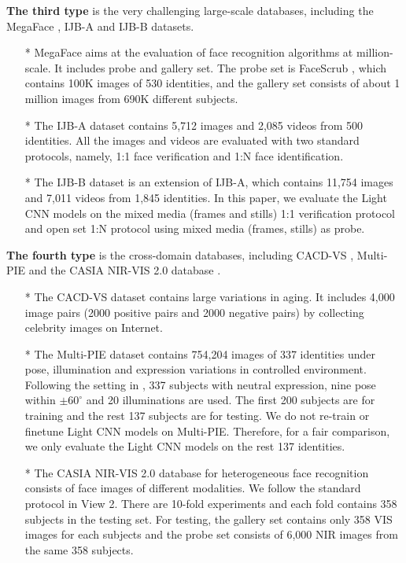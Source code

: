 \documentclass[journal,transmag]{IEEEtran}
\begin{document}
\textbf{The third type} is the very challenging large-scale databases, including the MegaFace \cite{kemelmacher2016megaface}, IJB-A \cite{klare2015pushing} and IJB-B \cite{whitelam2017iarpa} datasets.
\begin{itemize}\setlength{\itemsep}{1pt}
\item[*] MegaFace aims at the evaluation of face recognition algorithms at million-scale. It includes probe and gallery set. The probe set is FaceScrub \cite{DBLP:conf/icip/NgW14}, which contains 100K images of 530 identities, and the gallery set consists of about 1 million images from 690K different subjects.
\item[*] The IJB-A dataset contains 5,712 images and 2,085 videos from 500 identities. All the images and videos are evaluated with two standard protocols, namely, 1:1 face verification and 1:N face identification.
\item[*] The IJB-B dataset is an extension of IJB-A, which contains 11,754 images and 7,011 videos from 1,845 identities. In this paper, we evaluate the Light CNN models on the mixed media (frames and stills) 1:1 verification protocol and open set 1:N protocol using mixed media (frames, stills) as probe.
\end{itemize}

\textbf{The fourth type} is the cross-domain databases, including CACD-VS \cite{DBLP:journals/tmm/ChenCH15}, Multi-PIE \cite{DBLP:journals/ivc/GrossMCKB10} and the CASIA NIR-VIS 2.0 database \cite{DBLP:conf/cvpr/LiYLL13}.
\begin{itemize}\setlength{\itemsep}{1pt}
\item[*] The CACD-VS dataset \cite{DBLP:journals/tmm/ChenCH15} contains large variations in aging. It includes 4,000 image pairs (2000 positive pairs and 2000 negative pairs) by collecting celebrity images on Internet.
\item[*] The Multi-PIE dataset contains 754,204 images of 337 identities under pose, illumination and expression variations in controlled environment.  Following the setting in \cite{DBLP:conf/nips/ZhuLWT14}, 337 subjects with neutral expression, nine pose within $\pm60^{\circ}$ and 20 illuminations are used. The first 200 subjects are for training and the rest 137 subjects are for testing. We do not re-train or finetune Light CNN models on Multi-PIE. Therefore, for a fair comparison, we only evaluate the Light CNN models on the rest 137 identities.
\item[*] The CASIA NIR-VIS 2.0 database for heterogeneous face recognition consists of face images of different modalities. We follow the standard protocol in View 2. There are 10-fold experiments and each fold contains 358 subjects in the testing set. For testing, the gallery set contains only 358 VIS images for each subjects and the probe set consists of 6,000 NIR images from the same 358 subjects.
\end{itemize}
\end{document}
